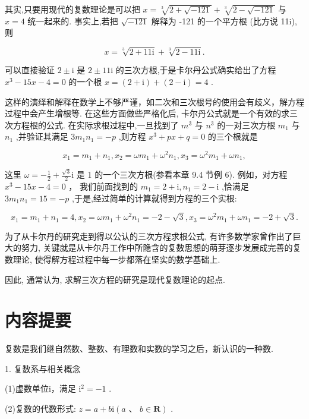 \documentclass[10pt]{article}
\begin{document}
其实,只要用现代的复数理论是可以把 \(x = \sqrt[3]{2 + \sqrt{-{121}}} + \sqrt[3]{2 - \sqrt{-{121}}}\) 与 \(x = 4\) 统一起来的. 事实上,若把 \(\sqrt{-{121}}\) 解释为 -121 的一个平方根 (比方说 11i),则

\[
x = \sqrt[3]{2 + {11}\mathrm{i}} + \sqrt[3]{2 - {11}\mathrm{i}}.
\]

可以直接验证 \(2 \pm  \mathrm{i}\) 是 \(2 \pm  {11}\mathrm{i}\) 的三次方根,于是卡尔丹公式确实给出了方程 \({x}^{3} - {15x} - 4 = 0\) 的一个根 \(x = \left( {2 + \mathrm{i}}\right)  + \left( {2 - \mathrm{i}}\right)  = 4\) .

这样的演绎和解释在数学上不够严谨，如二次和三次根号的使用会有歧义，解方程过程中会产生增根等. 在这些方面做些严格化后, 卡尔丹公式就是一个有效的求三次方程根的公式. 在实际求根过程中,一旦找到了 \({m}^{3}\) 与 \({n}^{3}\) 的一对三次方根 \({m}_{1}\) 与 \({n}_{1}\) ,并验证其满足 \(3{m}_{1}{n}_{1} =  - p\) ,则方程 \({x}^{3} + {px} + q = 0\) 的三个根就是

\[
{x}_{1} = {m}_{1} + {n}_{1},{x}_{2} = \omega {m}_{1} + {\omega }^{2}{n}_{1},{x}_{3} = {\omega }^{2}{m}_{1} + \omega {n}_{1},
\]

这里 \(\omega  =  - \frac{1}{2} + \frac{\sqrt{3}}{2}\mathrm{i}\) 是 1 的一个三次方根(参看本章 9.4 节例 6). 例如，对方程 \({x}^{3} - {15x} - 4 = 0\) ， 我们前面找到的 \({m}_{1} = 2 + \mathrm{i},{n}_{1} = 2 - \mathrm{i}\) ,恰满足 \(3{m}_{1}{n}_{1} = {15} =  - p\) ,于是,经过简单的计算就得到方程的三个实根:

\[
{x}_{1} = {m}_{1} + {n}_{1} = 4,{x}_{2} = \omega {m}_{1} + {\omega }^{2}{n}_{1} =  - 2 - \sqrt{3},{x}_{3} = {\omega }^{2}{m}_{1} + \omega {n}_{1} =  - 2 + \sqrt{3}.
\]

为了从卡尔丹的研究走到得以公认的三次方程求根公式, 有许多数学家曾作出了巨大的努力, 关键就是从卡尔丹工作中所隐含的复数思想的萌芽逐步发展成完善的复数理论, 使得解方程过程中每一步都落在坚实的数学基础上.

因此, 通常认为, 求解三次方程的研究是现代复数理论的起点.

\section*{内容提要}

复数是我们继自然数、整数、有理数和实数的学习之后，新认识的一种数.

1. 复数系与相关概念

(1)虚数单位i，满足 \({\mathrm{i}}^{2} =  - 1\) .

(2)复数的代数形式: \(z = a + b\mathrm{i}\left( {a\text{ 、 }b \in  \mathbf{R}}\right)\) .
\end{document}
